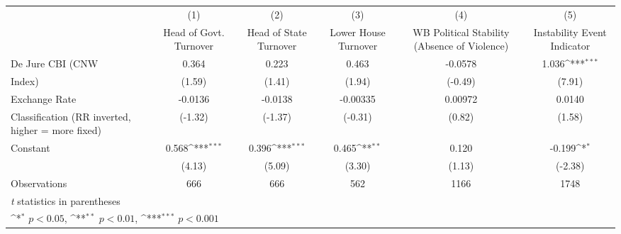 {
\def\sym#1{\ifmmode^{#1}\else\(^{#1}\)\fi}
\begin{tabular}{l*{5}{c}}
\toprule
                &\multicolumn{1}{c}{(1)}&\multicolumn{1}{c}{(2)}&\multicolumn{1}{c}{(3)}&\multicolumn{1}{c}{(4)}&\multicolumn{1}{c}{(5)}\\
                &\multicolumn{1}{c}{Head of Govt. Turnover}&\multicolumn{1}{c}{Head of State Turnover}&\multicolumn{1}{c}{Lower House Turnover}&\multicolumn{1}{c}{WB Political Stability (Absence of Violence)}&\multicolumn{1}{c}{Instability Event Indicator}\\
\midrule
De Jure CBI (CNW&    0.364         &    0.223         &    0.463         &  -0.0578         &    1.036\sym{***}\\
Index)          &   (1.59)         &   (1.41)         &   (1.94)         &  (-0.49)         &   (7.91)         \\
\addlinespace
Exchange Rate   &  -0.0136         &  -0.0138         & -0.00335         &  0.00972         &   0.0140         \\
Classification (RR inverted, higher = more fixed)&  (-1.32)         &  (-1.37)         &  (-0.31)         &   (0.82)         &   (1.58)         \\
\addlinespace
Constant        &    0.568\sym{***}&    0.396\sym{***}&    0.465\sym{**} &    0.120         &   -0.199\sym{*}  \\
                &   (4.13)         &   (5.09)         &   (3.30)         &   (1.13)         &  (-2.38)         \\
\midrule
Observations    &      666         &      666         &      562         &     1166         &     1748         \\
\bottomrule
\multicolumn{6}{l}{\footnotesize \textit{t} statistics in parentheses}\\
\multicolumn{6}{l}{\footnotesize \sym{*} \(p<0.05\), \sym{**} \(p<0.01\), \sym{***} \(p<0.001\)}\\
\end{tabular}
}
